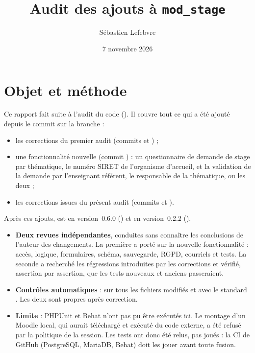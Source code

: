 \documentclass[11pt,a4paper]{article}
\title{Audit des ajouts à \texttt{mod\_stage}}
\author{Sébastien Lefebvre}
\date{7 novembre 2026}
\begin{document}
\maketitle

\section{Objet et méthode}

Ce rapport fait suite à l'audit du code (). Il couvre tout ce qui a été
ajouté depuis le commit  sur la branche  :

\begin{itemize}
  \item les corrections du premier audit (commits  et ) ;
  \item une fonctionnalité nouvelle (commit ) : un questionnaire de demande de stage par
    thématique, le numéro SIRET de l'organisme d'accueil, et la validation de la demande par
    l'enseignant référent, le responsable de la thématique, ou les deux ;
  \item les corrections issues du présent audit (commits  et ).
\end{itemize}

\noindent Après ces ajouts,  est en version~0.6.0 () et
 en version~0.2.2 ().

\begin{itemize}
  \item \textbf{Deux revues indépendantes}, conduites sans connaître les conclusions de l'auteur
    des changements. La première a porté sur la nouvelle fonctionnalité : accès, logique, formulaires, schéma,
    sauvegarde, RGPD, courriels et tests. La seconde a recherché les régressions introduites par les
    corrections et vérifié, assertion par assertion, que les tests nouveaux et anciens passeraient.
  \item \textbf{Contrôles automatiques} :  sur tous les fichiers modifiés et
     avec le standard . Les deux sont propres après correction.
  \item \textbf{Limite} : PHPUnit et Behat n'ont pas pu être exécutés ici. Le montage d'un Moodle
    local, qui aurait téléchargé et exécuté du code externe, a été refusé par la politique de la
    session. Les tests ont donc été relus, pas joués : la CI de GitHub (PostgreSQL, MariaDB,
    Behat) doit les jouer avant toute fusion.
\end{itemize}
\end{document}

